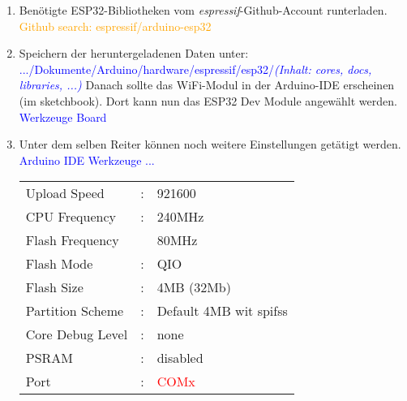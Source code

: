 \begin{enumerate}
\item Benötigte ESP32-Bibliotheken vom \textit{espressif}-Github-Account runterladen.\cite{grokhotkov_espressifarduino-esp32_2020} \newline
\textcolor{orange}{Github search: espressif/arduino-esp32} \cite{grokhotkov_espressifarduino-esp32_2020}
\newline

\item Speichern der heruntergeladenen Daten unter:\newline
\textcolor{blue}{.../Dokumente/Arduino/hardware/espressif/esp32/\textit{(Inhalt: cores, docs, libraries, ...)}}\newline
Danach sollte das WiFi-Modul in der Arduino-IDE erscheinen (im sketchbook). Dort kann nun das ESP32 Dev Module angewählt werden.\newline
\textcolor{blue} {Werkzeuge \textrightarrow Board}\newline
\item Unter dem selben Reiter können noch weitere Einstellungen getätigt werden.\newline
\textcolor{blue}{Arduino IDE \textrightarrow Werkzeuge \textrightarrow ...}\newline
\begin{tabular}{lll}
Upload Speed & : & 921600\\
CPU Frequency & : & 240MHz\\
Flash Frequency & & 80MHz\\
Flash Mode & : & QIO\\
Flash Size & : & 4MB (32Mb)\\
Partition Scheme & : & Default 4MB wit spifss\\
Core Debug Level & : & none\\
PSRAM & : & disabled\\
Port & : & \textcolor{red}{COMx}\\
\end{tabular}


\end{enumerate}
